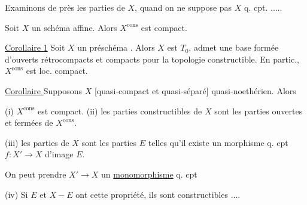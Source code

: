 Examinons  de près les parties   de $X$, quand on ne suppose pas $X$ q. cpt. .....


\uline{} Soit $X$ un schéma affine. Alors $X^{\mathrm{cons}}$ est compact.

\uline{Corollaire 1} Soit $X$ un préschéma  . Alors $X$ est $T_0$, admet une base formée d'ouverts rétrocompacts et compacts pour la topologie constructible. En partic., $X^{\mathrm{cons}}$ est loc. compact.

\uline{Corollaire } Supposons  $X$ [quasi-compact et quasi-séparé]  quasi-noethérien. Alors

(i) $X^{\mathrm{cons}}$ est compact. (ii) les parties constructibles de $X$ sont les parties ouvertes et fermées de $X^{\mathrm{cons}}$.

(iii) les parties   de $X$ sont les parties $E$ telles qu'il existe un morphisme q. cpt $f:X'\longrightarrow X$ d'image $E$.

On peut prendre   $X'\longrightarrow X$ un \uline{monomorphisme} q. cpt 

\deleted{[NB. \unsure{admet}} (iv) Si $E$ et $X-E$ ont cette propriété, ils sont constructibles ....

